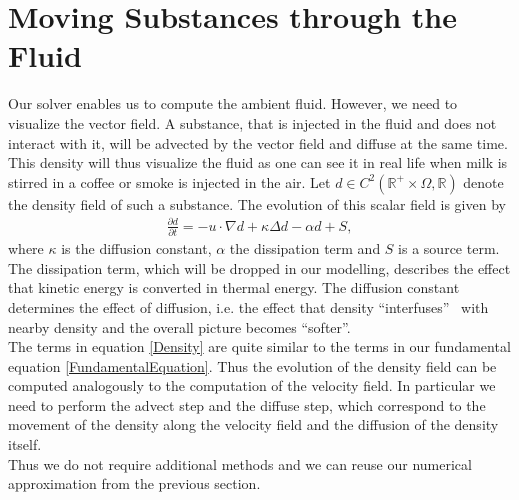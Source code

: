 \documentclass[a4paper,10pt,oneside,final,german,openbib,pdftex,titlepage]{scrbook}
\begin{document}
\section{Moving Substances through the Fluid}
Our solver enables us to compute the ambient fluid. However, we need to visualize the vector field. A substance, that is injected in the fluid and does not interact with it, will be advected by the vector field and diffuse at the same time. This density will thus visualize the fluid as one can see it in real life when milk is stirred in a coffee or smoke is injected in the air. Let $d \in C^2(\mathbb{R}^+\times\Omega, \mathbb{R})$ denote the density field of such a substance. The evolution of this scalar field is given by
\begin{align}
	\frac{\partial d}{\partial t} = - u \cdot \nabla d + \kappa \Delta d - \alpha  d + S, \label{Density}
\end{align}
where $\kappa$ is the diffusion constant, $\alpha$ the dissipation term and $S$ is a source term. The dissipation term, which will be dropped in our modelling, describes the effect that kinetic energy is converted in thermal energy. The diffusion constant determines the effect of diffusion, i.e. the effect that density ``interfuses'' ~with nearby density and the overall picture becomes ``softer''.\\

The terms in equation \ref{Density} are quite similar to the terms in our fundamental equation \ref{FundamentalEquation}. Thus the evolution of the density field can be computed analogously to the computation of the velocity field. In particular we need to perform the advect step and the diffuse step, which correspond to the movement of the density along the velocity field and the diffusion of the density itself.\\
Thus we do not require additional methods and we can reuse our numerical approximation from the previous section.
\end{document}
